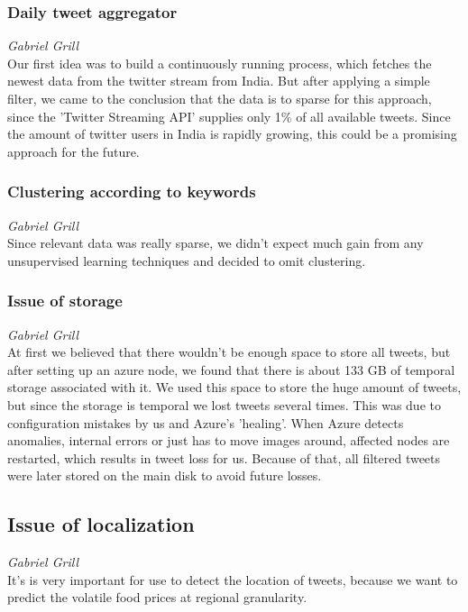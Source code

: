 \subsubsection*{Daily tweet aggregator}
\emph{Gabriel Grill} \\
Our first idea was to build a continuously running process, which fetches the newest data from the twitter stream from India. But after applying a simple filter, we came to the conclusion that the data is to sparse for this approach, since the 'Twitter Streaming API' supplies only 1\% of all available tweets. Since the amount of twitter users in India is rapidly growing, this could be a promising approach for the future.

\subsubsection*{Clustering according to keywords}
\emph{Gabriel Grill} \\
Since relevant data was really sparse, we didn't expect much gain from any unsupervised learning techniques and decided to omit clustering.

\subsubsection*{Issue of storage}
\emph{Gabriel Grill} \\
At first we believed that there wouldn't be enough space to store all tweets, but after setting up an azure node, we found that there is about 133 GB of temporal storage associated with it. We used this space to store the huge amount of tweets, but since the storage is temporal we lost tweets several times. This was due to configuration mistakes by us and Azure's 'healing'. When Azure detects anomalies, internal errors or just has to move images around, affected nodes are restarted, which results in tweet loss for us. Because of that, all filtered tweets were later stored on the main disk to avoid future losses.

\subsection*{Issue of localization}
\emph{Gabriel Grill} \\
It's is very important for use to detect the location of tweets, because we want to predict the volatile food prices at regional granularity.

